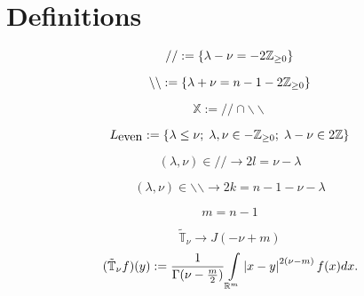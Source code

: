 \documentclass[a4paper,landscape,12pt]{article}
\newcommand{\Le}{L_{\mbox{even}}}
\begin{document}
\section{Definitions}
\begin{center}\begin{equation*} //:=\left\{\lambda-\nu=-2\mathbb{Z}_{\geq0}\right\} \end{equation*}\end{center}
\begin{center}\begin{equation*} \backslash\backslash:=\left\{\lambda+\nu=n-1-2\mathbb{Z}_{\geq0}\right\} \end{equation*}\end{center}
\begin{center}\begin{equation*} \mathbb{X}:=//\cap\backslash\backslash \end{equation*}\end{center}
\begin{center}\begin{equation*}\Le:=\mycbra{\lambda\leq\nu;\;\lambda,\nu\in-\Z_{\geq0};\;\lambda-\nu\in2\Z}\end{equation*}\end{center}
\begin{center}\begin{equation*}(\lambda,\nu)\in//\longrightarrow 2l=\nu-\lambda\end{equation*}\end{center}
\begin{center}\begin{equation*}(\lambda,\nu)\in\backslash\backslash\longrightarrow 2k=n-1-\nu-\lambda\end{equation*}\end{center}
\begin{center}\begin{equation*} m=n-1\end{equation*}\end{center}
$$\tilde{\mathbb{T}}_\nu\to J(-\nu+m)$$
$$(\tilde{\mathbb{T}}_\nu f)(y):=\frac{1}{\Gamma(\nu-\frac{m}{2})}\int_{\R^m}\myabs{x-y}^{2(\nu-m)}f(x)dx.$$
\end{document}
